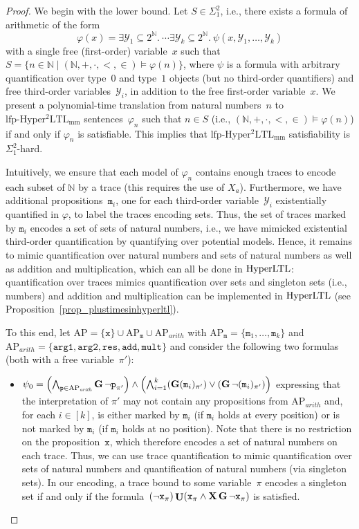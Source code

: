 \documentclass[dvipsnames,10pt,a4paper]{amsart}
\theoremstyle{definition}
\theoremstyle{remark}
\newcommand{\nats}{\mathbb{N}}
\renewcommand{\phi}{\varphi}
\newcommand{\pow}[1]{2^{#1}}
\newcommand{\set}[1]{\{#1\}}
\newcommand{\G}{\mathop{\mathbf{G}\vphantom{a}}\nolimits}
\DeclareMathOperator{\U}{\mathbf{U}}
\newcommand{\X}{\mathop{\mathbf{X}\vphantom{a}}\nolimits}
\newcommand{\hyltl}{\mathrm{Hyper\-LTL}\xspace}
\newcommand{\lfpsohyltlfp}{\mathrm{lfp\text{-}{Hyper^2LTL_{\mathrm{mm}}}}\xspace}
\newcommand{\ap}[0]{\mathrm{AP}}
\newcommand{\univar}{X_a}
\newcommand{\inprop}{\mathtt{x}}
\newcommand{\proposition}{\texttt{p}}
\newcommand{\argone}{\texttt{arg1}}
\newcommand{\argtwo}{\texttt{arg2}}
\newcommand{\res}{\texttt{res}}
\newcommand{\add}{\texttt{add}}
\newcommand{\mult}{\texttt{mult}}
\newcommand{\arith}{\mathit{arith}}
\newcommand{\natsstruct}{(\nats, +, \cdot, <, \in)}
\newcommand{\marker}{\texttt{m}}
\begin{document}
\begin{proof}
We begin with the lower bound. Let $S \in \Sigma_1^2$, i.e., there exists a formula of arithmetic of the form
\[
\phi(x) = \exists \mathcal{Y}_1\subseteq \pow{\nats}.\ \cdots \exists \mathcal{Y}_k\subseteq \pow{\nats}. \ \psi(x, \mathcal{Y}_1, \ldots,\mathcal{Y}_k)
\]
with a single free (first-order) variable~$x$ such that $S = \set{n \in\nats \mid \natsstruct\models\phi(n) }$, where $\psi$ is a formula with arbitrary quantification over type~$0$ and type~$1$ objects (but no third-order quantifiers) and free third-order variables~$\mathcal{Y}_i$, in addition to the free first-order variable~$x$.
We present a polynomial-time translation from natural numbers~$n$ to $\lfpsohyltlfp$ sentences~$\phi_n$ such that $n \in S$ (i.e., $\natsstruct \models \phi(n)$) if and only if $\phi_n$ is satisfiable.
This implies that $\lfpsohyltlfp$ satisfiability is $\Sigma_1^2$-hard.

Intuitively, we ensure that each model of $\phi_n$ contains enough traces to encode each subset of $\nats$ by a trace (this requires the use of $\univar$). 
Furthermore, we have additional propositions~$\marker_i$, one for each third-order variable~$\mathcal{Y}_i$ existentially quantified in $\phi$, to label the traces encoding sets.
Thus, the set of traces marked by $\marker_i$ encodes a set of sets of natural numbers, i.e., we have mimicked existential third-order quantification by quantifying over potential models. 
Hence, it remains to mimic quantification over natural numbers and sets of natural numbers as well as addition and multiplication, which can all be done in $\hyltl$: quantification over traces mimics quantification over sets and singleton sets (i.e., numbers) and addition and multiplication can be implemented in $\hyltl$ (see Proposition~\ref{prop_plustimesinhyperltl}). 

To this end, let $\ap = \set{\inprop} \cup \ap_\marker \cup \ap_\arith$ with $\ap_\marker = \set{\marker_1,\ldots, \marker_k}$ and $\ap_\arith = \set{ \argone, \argtwo, \res, \add, \mult}$ and consider the following two formulas (both with a free variable~$\pi'$):
\begin{itemize}
    \item $\psi_0 = \left(\bigwedge_{\proposition \in \ap_\arith} \G\neg\proposition_{\pi'}\right) \wedge \left(\bigwedge_{i=1}^k (\G (\marker_i)_{\pi'}) \vee (\G\neg(\marker_i)_{\pi'})\right)$ expressing that the interpretation of $\pi'$ may not contain any propositions from $\ap_\arith$ and, for each $i \in [k]$, is either marked by $\marker_i$ (if $\marker_i$ holds at every position) or is not marked by $\marker_i$ (if $\marker_i$ holds at no position). Note that there is no restriction on the proposition~$\inprop$, which therefore encodes a set of natural numbers on each trace. 
    Thus, we can use trace quantification to mimic quantification over sets of natural numbers and quantification of natural numbers (via singleton sets).
    In our encoding, a trace bound to some variable~$\pi$ encodes a singleton set if and only if the formula~$(\neg \inprop_{\pi})\U(\inprop_{\pi} \wedge \X\G\neg \inprop_{\pi}) $ is satisfied.
    

\end{itemize}
\end{proof}
\end{document}
